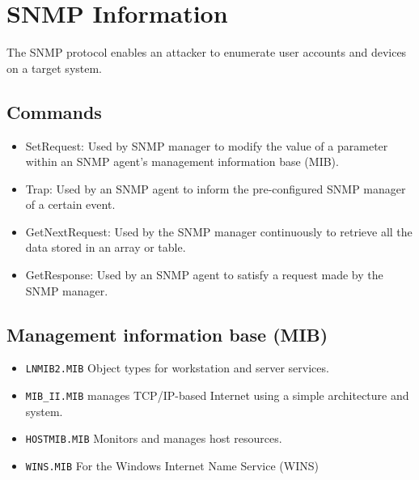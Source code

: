 \section{SNMP Information}
The SNMP protocol enables an attacker to enumerate user accounts and devices on a target system.
\subsection{Commands}
\begin{itemize}
    \item SetRequest: Used by SNMP manager to modify the value of a parameter within an SNMP agent's management information base (MIB).
    \item Trap: Used by an SNMP agent to inform the pre-configured SNMP manager of a certain event.
    \item GetNextRequest: Used by the SNMP manager continuously to retrieve all the data stored in an array or table.
    \item GetResponse: Used by an SNMP agent to satisfy a request made by the SNMP manager.
\end{itemize}

\subsection{Management information base (MIB)}
\begin{itemize}
    \item \verb|LNMIB2.MIB| Object types for workstation and server services.
    \item \verb|MIB_II.MIB| manages TCP/IP-based Internet using a simple architecture and system.
    \item \verb|HOSTMIB.MIB| Monitors and manages host resources.
    \item \verb|WINS.MIB| For the Windows Internet Name Service (WINS)
\end{itemize}